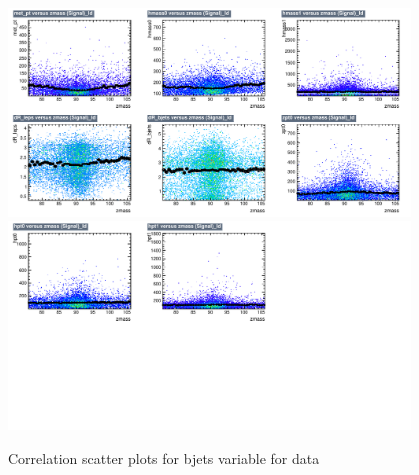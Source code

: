 \begin{figure}[!htb]%
\centering
\includegraphics[width=0.95\textwidth]{figures/CRDY/dataset/plots/correlationscatter_zmass__Id_c1.pdf}
\includegraphics[width=0.95\textwidth]{figures/CRDY/dataset/plots/correlationscatter_zmass__Id_c2.pdf}
\caption{ Correlation scatter plots for \Zll bjets variable for data}%
\label{fig:correlations_CRDY_zmass_S}                                                       
\end{figure}



